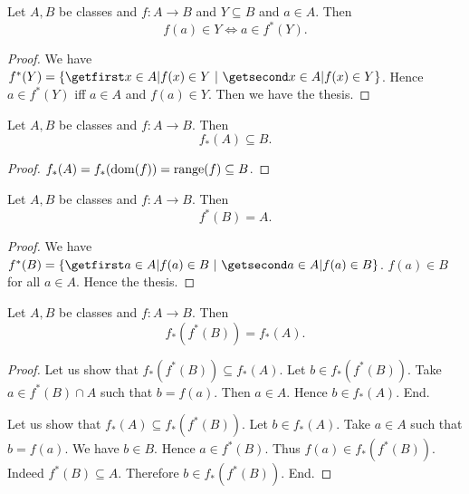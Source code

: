 \documentclass[../../set-theory/set-theory.tex]{subfiles}
\begin{document}
  \begin{forthel}
    \begin{proposition}
      Let $A, B$ be classes and $f : A \to B$ and $Y \subseteq B$ and $a \in A$.
      Then \[ f(a) \in Y \iff a \in f^{*}(Y). \]
    \end{proposition}
    \begin{proof}
      We have $f^{*}(Y) = \class{ x \in A | f(x) \in Y }$.
      Hence $a \in f^{*}(Y)$ iff $a \in A$ and $f(a) \in Y$.
      Then we have the thesis.
    \end{proof}
  \end{forthel}

  \begin{forthel}
    \begin{proposition}
      Let $A, B$ be classes and $f : A \to B$.
      Then \[ f_{*}(A) \subseteq B. \]
    \end{proposition}
    \begin{proof}
      $f_{*}(A) = f_{*}(\operatorname{dom}(f)) = \operatorname{range}(f) \subseteq B$.
    \end{proof}
  \end{forthel}

  \begin{forthel}
    \begin{proposition}
      Let $A, B$ be classes and $f : A \to B$.
      Then \[ f^{*}(B) = A. \]
    \end{proposition}
    \begin{proof}
      We have $f^{*}(B) = \class{ a \in A | f(a) \in B }$.
      $f(a) \in B$ for all $a \in A$.
      Hence the thesis.
    \end{proof}
  \end{forthel}

  \begin{forthel}
    \begin{proposition}
      Let $A, B$ be classes and $f : A \to B$.
      Then \[ f_{*}(f^{*}(B)) = f_{*}(A). \]
    \end{proposition}
    \begin{proof}
      Let us show that $f_{*}(f^{*}(B)) \subseteq f_{*}(A)$.
        Let $b \in f_{*}(f^{*}(B))$.
        Take $a \in f^{*}(B) \cap A$ such that $b = f(a)$.
        Then $a \in A$.
        Hence $b \in f_{*}(A)$.
      End.

      Let us show that $f_{*}(A) \subseteq f_{*}(f^{*}(B))$.
        Let $b \in f_{*}(A)$.
        Take $a \in A$ such that $b = f(a)$.
        We have $b \in B$.
        Hence $a \in f^{*}(B)$.
        Thus $f(a) \in f_{*}(f^{*}(B))$.
        Indeed $f^{*}(B) \subseteq A$.
        Therefore $b \in f_{*}(f^{*}(B))$.
      End.
    \end{proof}
  \end{forthel}
\end{document}
